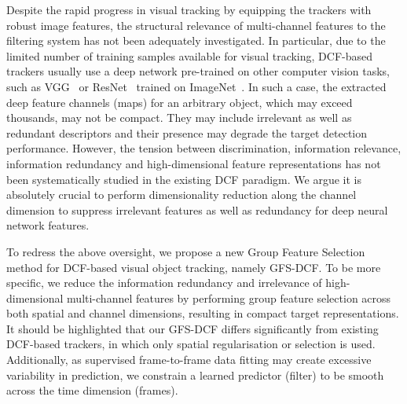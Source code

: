 \documentclass[10pt,twocolumn,letterpaper]{article}
\begin{document}
Despite the rapid progress in visual tracking by equipping the trackers with robust image features, the structural relevance of multi-channel features to the filtering system has not been adequately investigated.
In particular, due to the limited number of training samples available for visual tracking, DCF-based trackers usually use a deep network pre-trained on other computer vision tasks, such as VGG~\cite{simonyan2014very} or ResNet~\cite{he2016deep} trained on ImageNet~\cite{russakovsky2015imagenet}.
In such a case, the extracted deep feature channels (maps) for an arbitrary object, which may exceed thousands, may not be compact. They may include irrelevant as well as redundant descriptors and their presence may degrade the target detection performance.
However, the tension between discrimination, information relevance, information redundancy and high-dimensional feature representations has not been systematically studied in the existing DCF paradigm.
We argue it is absolutely crucial to perform dimensionality reduction along the channel dimension to suppress irrelevant features as well as redundancy for deep neural network features.

To redress the above oversight, we propose a new Group Feature Selection method for DCF-based visual object tracking, namely GFS-DCF.
To be more specific, we reduce the information redundancy and irrelevance of high-dimensional multi-channel features by performing group feature selection across both spatial and channel dimensions, resulting in compact target representations.
It should be highlighted that our GFS-DCF differs significantly from existing DCF-based trackers, in which only spatial regularisation or selection is used.
Additionally, as supervised frame-to-frame data fitting may create excessive variability in prediction, we constrain a learned predictor (filter) to be smooth across the time dimension (frames).
\end{document}
